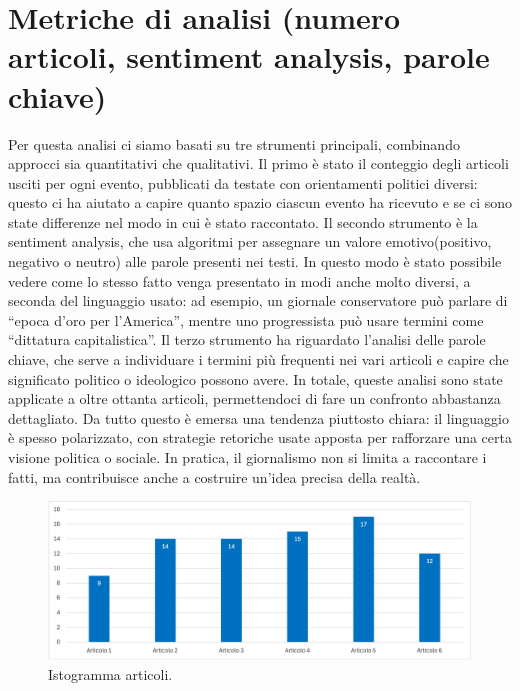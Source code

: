 \section{Metriche di analisi (numero articoli, sentiment analysis, parole chiave)}
Per questa analisi ci siamo basati su tre strumenti principali, combinando approcci sia quantitativi che qualitativi. Il primo è stato il conteggio degli articoli usciti per ogni evento, pubblicati da testate con orientamenti politici diversi: questo ci ha aiutato a capire quanto spazio ciascun evento ha ricevuto e se ci sono state differenze nel modo in cui è stato raccontato. Il secondo strumento è la sentiment analysis, che usa algoritmi per assegnare un valore emotivo(positivo, negativo o neutro) alle parole presenti nei testi. In questo modo è stato possibile vedere come lo stesso fatto venga presentato in modi anche molto diversi, a seconda del linguaggio usato: ad esempio, un giornale conservatore può parlare di “epoca d’oro per l’America”, mentre uno progressista può usare termini come “dittatura capitalistica”. Il terzo strumento ha riguardato l’analisi delle parole chiave, che serve a individuare i termini più frequenti nei vari articoli e capire che significato politico o ideologico possono avere. In totale, queste analisi sono state applicate a oltre ottanta articoli, permettendoci di fare un confronto abbastanza dettagliato. Da tutto questo è emersa una tendenza piuttosto chiara: il linguaggio è spesso polarizzato, con strategie retoriche usate apposta per rafforzare una certa visione politica o sociale. In pratica, il giornalismo non si limita a raccontare i fatti, ma contribuisce anche a costruire un’idea precisa della realtà.

\begin{figure}[H]
    \centering
    \includegraphics[width=1\linewidth]{Immagini/Istogramma Articoli.png}
    \caption{Istogramma articoli.}
    \label{fig:istogramma-articoli}
\end{figure}